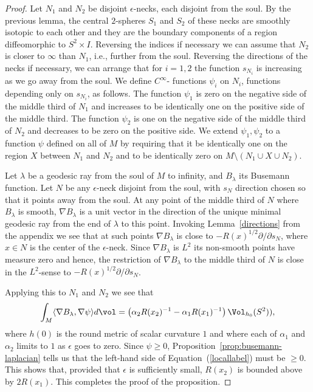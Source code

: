 \begin{proof}
Let $N_1$ and $N_2$ be disjoint $\epsilon$-necks, each disjoint from
the soul. By the previous lemma, the central $2$-spheres $S_1$ and
$S_2$ of these necks are smoothly isotopic to each other and they
are the boundary components of a region diffeomorphic to $S^2\times
I$. Reversing the indices if necessary we can assume that $N_2$ is
closer to $\infty$ than $N_1$, i.e., further from the soul.
Reversing the directions of the necks if necessary, we can arrange
that for $i=1,2$ the function $s_{N_i}$ is increasing as we go away
from the soul. We define $C^\infty$- functions $\psi_i$ on $N_i$,
functions depending only on $s_{N_i}$, as follows. The function
$\psi_1$ is zero on the negative side of the middle third of $N_1$
and increases to be identically one on the positive side of the
middle third. The function $\psi_2$ is one on the negative side of
the middle third of $N_2$ and decreases to be zero on the positive
side. We extend $\psi_1,\psi_2$ to a function $\psi$ defined on all
of $M$ by requiring that it be identically one on the region $X$
between $N_1$ and $N_2$ and to be identically zero on $M\setminus
(N_1\cup X\cup N_2)$.

Let $\lambda$ be a geodesic ray from the soul of $M$ to infinity,
and $B_\lambda$ its Busemann function. Let $N$ be any
$\epsilon$-neck disjoint from the soul, with $s_N$ direction chosen
so that it points away from the soul. At any point of the middle
third of $N$ where $B_\lambda$ is smooth, $\nabla B_\lambda$ is a
unit vector in the direction of the unique minimal geodesic ray from
the end of $\lambda$ to this point. Invoking Lemma~\ref{directions}
from the appendix we see that at such points $\nabla B_\lambda$ is
close to $-R(x)^{1/2}\partial/\partial s_N$, where $x\in N$ is the
center of the $\epsilon$-neck. Since $\nabla B_\lambda$ is $L^2$ its
non-smooth points have measure zero and hence, the restriction of
$\nabla B_\lambda$ to the middle third of $N$ is close in the
$L^2$-sense to $-R(x)^{1/2}\partial/\partial s_N$.

Applying this to $N_1$ and $N_2$ we see that
\begin{equation}\label{locallabel}
\int_M\langle \nabla B_\lambda,\nabla\psi\rangle d\vol=\left(\alpha_2R(x_2)^{-1}-\alpha_1R(x_1)^{-1}\right)\Vol_{h_0}(S^2)),\end{equation} where $h(0)$ is the round metric of
scalar curvature $1$ and where each of $\alpha_1$ and $\alpha_2$
limits to $1$ as $\epsilon$ goes to zero. Since $\psi\ge 0$,
Proposition~\ref{prop:busemann-laplacian} tells us that the left-hand side of
Equation~(\ref{locallabel}) must be $\ge 0$. This shows that,
provided that $\epsilon$ is sufficiently small, $R(x_2)$ is bounded
above by $2R(x_1)$. This completes the proof of the proposition.
\end{proof}


